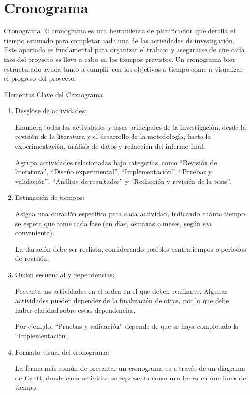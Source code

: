 \documentclass[9pt]{beamer}
\begin{document}
\section{Cronograma}
\begin{frame}{Cronograma}
El cronograma es una herramienta de planificación que detalla el tiempo estimado para completar cada una de las actividades de investigación. Este apartado es fundamental para organizar el trabajo y asegurarse de que cada fase del proyecto se lleve a cabo en los tiempos previstos. Un cronograma bien estructurado ayuda tanto a cumplir con los objetivos a tiempo como a visualizar el progreso del proyecto.

Elementos Clave del Cronograma

\begin{enumerate}
    \item Desglose de actividades:

    Enumera todas las actividades y fases principales de la investigación, desde la revisión de la literatura y el desarrollo de la metodología, hasta la experimentación, análisis de datos y redacción del informe final.

    Agrupa actividades relacionadas bajo categorías, como ``Revisión de literatura'', ``Diseño experimental'', ``Implementación'', ``Pruebas y validación'', ``Análisis de resultados'' y ``Redacción y revisión de la tesis''.

    \item Estimación de tiempos:

    Asigna una duración específica para cada actividad, indicando cuánto tiempo se espera que tome cada fase (en días, semanas o meses, según sea conveniente).

    La duración debe ser realista, considerando posibles contratiempos o periodos de revisión.

    \item Orden secuencial y dependencias:

    Presenta las actividades en el orden en el que deben realizarse. Algunas actividades pueden depender de la finalización de otras, por lo que debe haber claridad sobre estas dependencias.

    Por ejemplo, ``Pruebas y validación'' depende de que se haya completado la ``Implementación''.

    \item Formato visual del cronograma:

    La forma más común de presentar un cronograma es a través de un diagrama de Gantt, donde cada actividad se representa como una barra en una línea de tiempo.


\end{enumerate}
\end{frame}
\end{document}
